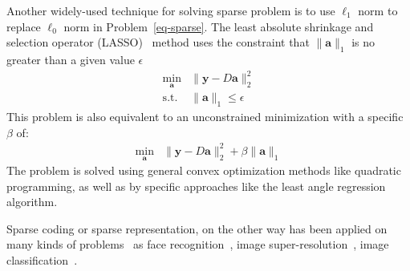 Another widely-used technique for solving sparse problem is to use $\ell_1$ norm to replace $\ell_0$ norm in Problem~\ref{eq-sparse}.
The least absolute shrinkage and selection operator (LASSO)~\cite{tibshirani1996regression} method uses the constraint that $\|\mathbf{a}\|_1$ is no greater than a given value $\epsilon$
\begin{equation}
\begin{array}{cl}
\min_{\mathbf{a}} & \|\mathbf{y}-D\mathbf{a}\|_2^2\\
\mathrm{s.t.} & \|\mathbf{a}\|_1 \leq \epsilon
\end{array}
\end{equation}
This problem is also equivalent to an unconstrained minimization with a specific $\beta$ of:
\begin{equation}
\begin{array}{cl}
\min_{\mathbf{a}} & \|\mathbf{y}-D\mathbf{a}\|_2^2 + \beta \|\mathbf{a}\|_1
\end{array}
\end{equation}
The problem is solved using general convex optimization methods like quadratic programming, as well as by specific approaches like the least angle regression~\cite{efron2004least} algorithm.

Sparse coding or sparse representation, on the other way has been applied on many kinds of problems~\cite{wright2010sparse} as face recognition~\cite{wright2009robust}, image super-resolution~\cite{yang2008image}, image classification~\cite{mairal2008discriminative}.

